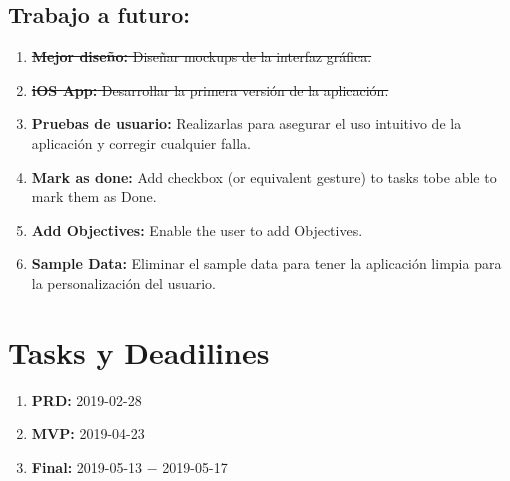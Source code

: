 \documentclass[]{article}
\begin{document}
\subsection{Trabajo a futuro:}
\begin{enumerate}
	\item \sout{\textbf{Mejor diseño:} Diseñar mockups de la interfaz gráfica.}
	\item \sout{\textbf{iOS App:} Desarrollar la primera versión de la aplicación.}
	\item \textbf{Pruebas de usuario:} Realizarlas para asegurar el uso intuitivo de la aplicación y corregir cualquier falla.
	\item \textbf{Mark as done:} Add checkbox (or equivalent gesture) to tasks tobe able to mark them as Done.
	\item \textbf{Add Objectives:} Enable the user to add Objectives.
	\item \textbf{Sample Data:} Eliminar el sample data para tener la aplicación limpia para la personalización del usuario.

\end{enumerate}
\section{Tasks y Deadilines}
\begin{enumerate}
	\item \textbf{PRD:} 2019-02-28
	\item \textbf{MVP:} 2019-04-23
	\item \textbf{Final:} 2019-05-13 $-$ 2019-05-17
\end{enumerate}
\end{document}
